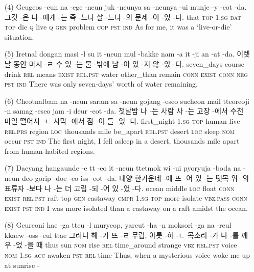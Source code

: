 \begin{itemize}
\item [(4)]
\tgl
		{Geugeos -eun na -ege -neun juk -neunya sa -neunya -ui munje -y -eot -da.}
		{그것 -은 나 -에게 -는 죽 -느냐 살 -느냐 -의 문제 -이 -었 -다.}
		{that	\textsc{top}	\textsc{1.sg}	\textsc{dat}	\textsc{top}	die	\textsc{q}	live	\textsc{q}	\textsc{gen}	problem	\textsc{cop}	\textsc{pst}	\textsc{ind}}
		{As for me, it was a `live-or-die' situation.}

\pagebreak

\item [(5)]
\tgl
		{Iretnal dongan masi -l su it -neun mul -bakke nam -a it -ji an -at -da.}
		{이렛날 동안 마시 -ㄹ 수 있 -는 물 -밖에 남 -아 있 -지 않 -았 -다.}
		{seven\_days	course	drink	\textsc{rel}	means	\textsc{exist}	\textsc{rel.pst}	water	other\_than	remain	\textsc{conn}	\textsc{exist}	\textsc{conn}	\textsc{neg}	\textsc{pst}	\textsc{ind}}
		{There was only seven-days' worth of water remaining.}
		
\item [(6)]
\tgl
		{Cheotnalbam na -neun saram sa -neun gojang -eseo sucheon mail tteoreoji -n samag -eseo jam -i deur -eot -da.}
		{첫날밤 나 -는 사람 사 -는 고장 -에서 수천 마일 떨어지 -ㄴ 사막 -에서 잠 -이 들 -었 -다.}
		{first\_night	\textsc{1.sg}	\textsc{top}	human	live	\textsc{rel.prs}	region	\textsc{loc}	thousands	mile	be\_apart	\textsc{rel.pst}	desert	\textsc{loc}	sleep	\textsc{nom}	occur	\textsc{pst}	\textsc{ind}}
		{The first night, I fell asleep in a desert, thousands mile apart from human-habited regions.}

\item [(7)]
\tgl
		{Daeyang hangaunde -e tt -eo it -neun ttetmok wi -ui pyoryuja -boda na -neun deo gorip -doe -eo iss -eot -da.}
		{대양 한가운데 -에 뜨 -어 있 -는 뗏목 위 -의 표류자 -보다 나 -는 더 고립 -되 -어 있 -었 -다.}
		{ocean	middle	\textsc{loc}	float	\textsc{conn}	\textsc{exist}	\textsc{rel.pst}	raft	top	\textsc{gen}	castaway	\textsc{cmpr}	\textsc{1.sg}	\textsc{top}	more	isolate	\textsc{vbz.pass}	\textsc{conn}	\textsc{exist}	\textsc{pst}	\textsc{ind}}
		{I was more isolated than a castaway on a raft amidst the ocean.}

\item [(8)]
\tgl
		{Geureoni hae -ga tteu -l muryeop, yareut -ha -n moksori -ga na -reul kkaew -oss -eul ttae}
		{그러니 해 -가 뜨 -ㄹ 무렵, 야릇 -하 -ㄴ 목소리 -가 나 -를 깨우 -었 -을 때}
		{thus	sun	\textsc{nom}	rise	\textsc{rel}	time\_around	strange	\textsc{vbz}	\textsc{rel.pst}	voice	\textsc{nom}	\textsc{1.sg}	\textsc{acc}	awaken	\textsc{pst}	\textsc{rel}	time}
		{Thus, when a mysterious voice woke me up at sunrise -}


\end{itemize}
